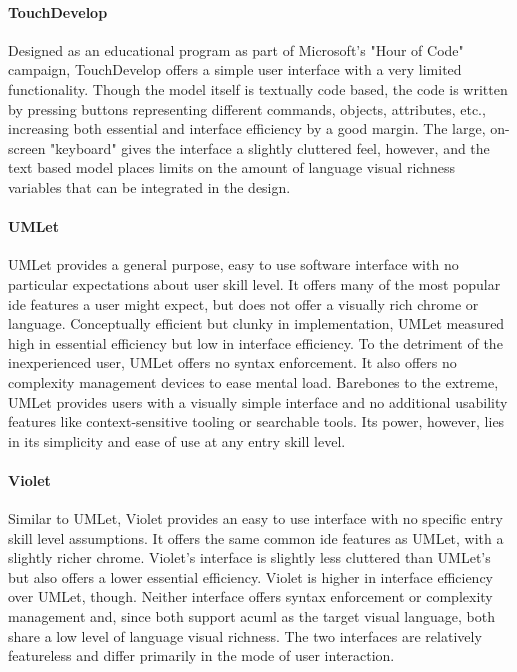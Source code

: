 \paragraph{TouchDevelop} Designed as an educational program as part of
Microsoft's "Hour of Code" campaign, TouchDevelop offers a simple user
interface with a very limited functionality. Though the model itself is
textually code based, the code is written by pressing buttons representing
different commands, objects, attributes, etc., increasing both essential
and interface efficiency by a good margin. The large, on-screen "keyboard"
gives the interface a slightly cluttered feel, however, and the text based
model places limits on the amount of language visual richness variables
that can be integrated in the design.

\paragraph{UMLet} UMLet provides a general purpose, easy to use software
interface with no particular expectations about user skill level. It offers
many of the most popular \ac{ide} features a user might expect, but does
not offer a visually rich chrome or language. Conceptually efficient but
clunky in implementation, UMLet measured high in essential efficiency but
low in interface efficiency. To the detriment of the inexperienced user,
UMLet offers no syntax enforcement. It also offers no complexity management
devices to ease mental load. Barebones to the extreme, UMLet provides users
with a visually simple interface and no additional usability features like
context-sensitive tooling or searchable tools. Its power, however, lies in
its simplicity and ease of use at any entry skill level.

\paragraph{Violet} Similar to UMLet, Violet provides an easy to use
interface with no specific entry skill level assumptions. It offers the
same common \ac{ide} features as UMLet, with a slightly richer chrome.
Violet's interface is slightly less cluttered than UMLet's but also offers
a lower essential efficiency. Violet is higher in interface efficiency over
UMLet, though. Neither interface offers syntax enforcement or complexity
management and, since both support ac{uml} as the target visual language,
both share a low level of language visual richness. The two interfaces are
relatively featureless and differ primarily in the mode of user
interaction.

